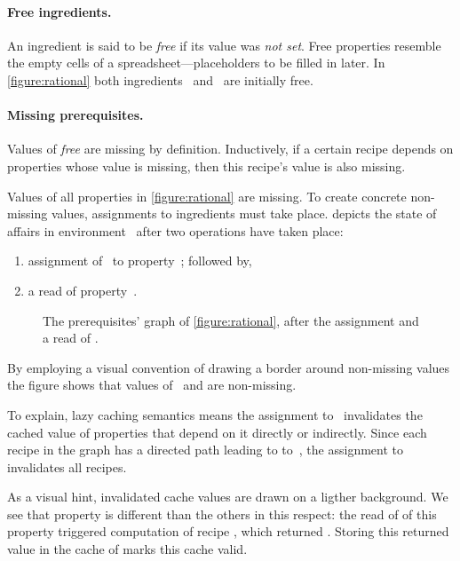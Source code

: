 \paragraph{Free ingredients.}
An ingredient is said to be \emph{free} if its value was \emph{not
set}. Free properties resemble the empty cells of a spreadsheet---placeholders
to be filled in later. In \cref{figure:rational} both ingredients~
and~ are initially free.

\paragraph{Missing prerequisites.}
Values of \emph{free} are missing by definition. Inductively, if a certain
recipe depends on properties whose value is missing, then this recipe's value
is also missing.

Values of all properties in \cref{figure:rational} are missing. To create
concrete non-missing values, assignments to ingredients must take place.
 depicts the state of affairs in
environment~ after two operations have taken place:
\begin{enumerate}
  \item assignment of~ to property~; followed by,
  \item a read of property~.
\end{enumerate}

\begin{figure}
  \caption{\label{figure:rational:1}%
    The prerequisites' graph of \cref{figure:rational},
    after the assignment  and a read of .
  }
  \begin{adjustbox}{max width=\columnwidth}
    
  \end{adjustbox}
\end{figure}

By employing a visual convention of drawing a border around non-missing values
the figure shows that values of~ and  are non-missing.

To explain, lazy caching semantics means the assignment to~ invalidates
the cached value of properties that depend on it directly
or indirectly. Since each recipe in the graph has a directed path
leading to to~, the assignment to~ invalidates all recipes.

As a visual hint, invalidated cache values are drawn on a ligther background.
We see that property  is different than the others in this
respect: the read of of this property triggered computation of recipe
, which returned . Storing this returned value in the cache
of  marks this cache valid.

